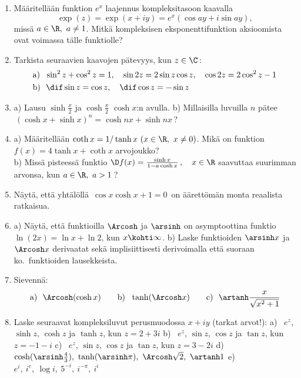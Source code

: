 \Harj
\begin{enumerate}

\item \label{H-VII-3: E(z) vaihtoehto}
Määritellään funktion $e^x$ laajennus kompleksitasoon kaavalla
\[
\exp(z)=\exp(x+iy)=e^x(\cos ay + i\sin ay),
\]
missä $a\in\R,\ a \neq 1$. Mitkä kompleksisen eksponenttifunktion aksioomista ovat voimassa 
tälle funktiolle?

\item
Tarkista seuraavien kaavojen pätevyys, kun $z\in\C$\,:
\begin{align*}
&\text{a)}\ \ \sin^2 z+\cos^2 z=1, \quad \sin 2z=2\sin z\cos z, \quad \cos 2z=2\cos^2 z-1 \\
&\text{b)}\ \ \dif\sin z=\cos z, \quad \dif\cos z=-\sin z
\end{align*}

\item
a) Lausu $\sinh\frac{x}{2}$ ja $\cosh\frac{x}{2}$ $\cosh x$:n avulla. \newline
b) Millaisilla luvuilla $n$ pätee $\,(\cosh x+\sinh x)^n=\cosh nx+\sinh nx\,$?

\item
a) Määritellään $\coth x=1/\tanh x\ (x\in\R,\ x \neq 0)$. Mikä on funktion 
$f(x)=4\tanh x+\coth x$ arvojoukko? \\
b) Missä pisteessä funktio
$\D f(x)=\frac{\sinh x}{1-a\cosh x}\,, \quad x\in\R$ \vspace{1mm}\newline
saavuttaa suurimman arvonsa, kun $a\in\R,\ a>1$\,?

\item
Näytä, että yhtälöllä $\,\cos x\cosh x+1=0\,$ on äärettömän monta reaalista ratkaisua.

\item
a) Näytä, että funktioilla $\Arcosh$ ja $\arsinh$ on asymptoottina funktio 
$\ln (2x)=\ln x + \ln 2$, kun $x\kohti\infty$. \newline
b) Laske funktioiden $\arsinh x$ ja $\Arcosh x$ derivaatat sekä implisiittisesti
derivoimalla että suoraan ko.\ funktioiden lausekkeista.

\item
Sievennä:
\[
\text{a)}\ \ \Arcosh(\cosh x) \qquad
\text{b)}\ \ \tanh(\Arcosh x) \qquad 
\text{c)}\ \ \artanh\frac{x}{\sqrt{x^2+1}}
\]

\item
Laske seuraavat kompleksiluvut perusmuodossa $x+iy$ (tarkat arvot!): \vspace{1mm} \newline
a) \ $e^z$, $\sinh z$, $\cosh z$ ja $\tanh z$, kun $z=2+3i$ \newline
b) \ $e^z$, $\sin z$, $\cos z$ ja $\tan z$, kun $z=-1-i$ \newline
c) \ $e^z$, $\sin z$, $\cos z$ ja $\tan z$, kun $z=3-2i$ \newline
d) \ $\cosh(\arsinh\frac{4}{3}),\ \tanh(\arsinh\pi),\ \Arcosh\sqrt{2},\ \artanh 1$ \newline 
e) \ $e^i,\ i^e,\ \log i,\ 5^{-i},\ i^{-\pi},\ i^i$


\end{enumerate}
